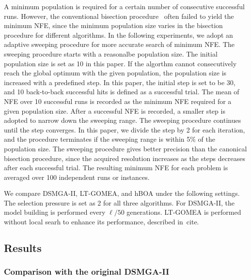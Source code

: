 \documentclass{sig-alternate-05-2015}
\begin{document}
A minimum population is required for a certain number of consecutive successful runs.
However, the conventional bisection procedure~\cite{pelikan:hBOA} often failed to yield the minimum NFE, since the minimum population size varies in the bisection procedure for different algorithms.
In the following experiments, we adopt an adaptive sweeping procedure for more accurate search of minimum NFE.
The sweeping procedure starts with a reasonalbe population size.
The initial population size is set as 10 in this paper.
If the algorthm cannot consecutively reach the global optimum with the given population, the population size is increased with a predefined step.
In this paper, the initial step is set to be 30, and 10 back-to-back successful hits is defined as a successful trial.
The mean of NFE over 10 successful runs is recorded as the minimum NFE required for a given population size.
After a successful NFE is recorded, a smaller step is adopted to narrow down the sweeping range.
The sweeping procedure continues until the step converges.
In this paper, we divide the step by 2 for each iteration, and the procedure terminates if the sweeping range is within 5\% of the population size.
The sweeping procedure gives better precision than the canonical bisection procedure, since the acquired resolution increases as the steps decreases after each successful trial.
The resulting minimum NFE for each problem is averaged over 100 independent runs or instances.

We compare DSMGA-II, LT-GOMEA, and hBOA under the following settings. The selection pressure is set as 2 for all three algorithms. 
For DSMGA-II, the model building is performed every $\ell/50$ generations.
LT-GOMEA is performed without local searh to enhance its performance, described in~cite{}.




\subsection{Results}

\subsubsection{ Comparison with the original DSMGA-II }
\end{document}
